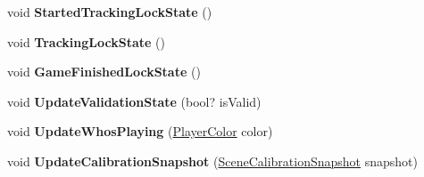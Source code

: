 \begin{DoxyCompactItemize}
void {\bfseries Started\+Tracking\+Lock\+State} ()
\item 
\mbox{\label{class_chess_tracking_1_1_user_interface_1_1_user_interface_output_facade_a61e1170bebd2c5f8d143f5b1666dbde4}} 
void {\bfseries Tracking\+Lock\+State} ()
\item 
\mbox{\label{class_chess_tracking_1_1_user_interface_1_1_user_interface_output_facade_a119d915d199c9c1331dd9c2c49b121c6}} 
void {\bfseries Game\+Finished\+Lock\+State} ()
\item 
\mbox{\label{class_chess_tracking_1_1_user_interface_1_1_user_interface_output_facade_a56129d230e88be3ee1491829739b1cca}} 
void {\bfseries Update\+Validation\+State} (bool? is\+Valid)
\item 
\mbox{\label{class_chess_tracking_1_1_user_interface_1_1_user_interface_output_facade_afe8afd397b4bf355352039a68ddb597f}} 
void {\bfseries Update\+Whos\+Playing} (\mbox{\hyperlink{namespace_chess_tracking_1_1_game_ab79070a55977a8c8326e9cdda7dcfa9a}{Player\+Color}} color)
\item 
\mbox{\label{class_chess_tracking_1_1_user_interface_1_1_user_interface_output_facade_a91fcb50cc96a557020073e7fa7c6812a}} 
void {\bfseries Update\+Calibration\+Snapshot} (\mbox{\hyperlink{class_chess_tracking_1_1_image_processing_1_1_pipeline_data_1_1_scene_calibration_snapshot}{Scene\+Calibration\+Snapshot}} snapshot)
\end{DoxyCompactItemize}

